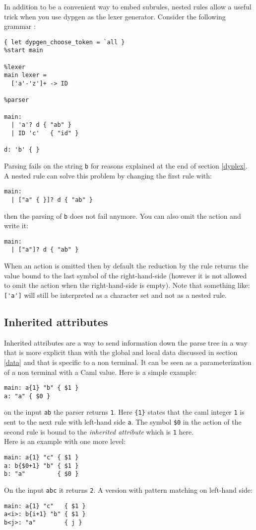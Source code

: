 \documentclass[12pt]{article}
\begin{document}
{In addition to be a convenient way to embed subrules, nested rules allow a useful trick when you use dypgen as the lexer generator. Consider the following grammar :
\begin{verbatim}
{ let dypgen_choose_token = `all }
%start main

%lexer
main lexer =
  ['a'-'z']+ -> ID

%parser

main:
  | 'a'? d { "ab" }
  | ID 'c'   { "id" }

d: 'b' { }
\end{verbatim}
Parsing fails on the string \verb|b| for reasons explained at the end of section \ref{dyplex}.\\

A nested rule can solve this problem by changing the first rule with:
\begin{verbatim}
main:
  | ["a" { }]? d { "ab" }
\end{verbatim}
then the parsing of \verb|b| does not fail anymore. You can also omit the action and write it:
\begin{verbatim}
main:
  | ["a"]? d { "ab" }
\end{verbatim}
When an action is omitted then by default the reduction by the rule returns the value bound to the last symbol of the right-hand-side (however it is not allowed to omit the action when the right-hand-side is empty). Note that something like: \verb|['a']| will still be interpreted as a character set and not as a nested rule.

\subsection{Inherited attributes}

Inherited attributes are a way to send information down the parse tree in a way that is more explicit than with the global and local data discussed in section \ref{data} and that is specific to a non terminal. It can be seen as a parameterization of a non terminal with a Caml value. Here is a simple example:
\begin{verbatim}
main: a{1} "b" { $1 }
a: "a" { $0 }
\end{verbatim}
on the input \verb|ab| the parser returns \verb|1|. Here \verb|{1}| states that the caml integer \verb|1| is sent to the next rule with left-hand side \verb|a|. The symbol \verb|$0| in the action of the second rule is bound to the \emph{inherited attribute} which is \verb|1| here.\\
Here is an example with one more level:
\begin{verbatim}
main: a{1} "c" { $1 }
a: b{$0+1} "b" { $1 }
b: "a"         { $0 }
\end{verbatim}
On the input \verb|abc| it returns \verb|2|. A version with pattern matching on left-hand side:
\begin{verbatim}
main: a{1} "c"   { $1 }
a<i>: b{i+1} "b" { $1 }
b<j>: "a"        { j }
\end{verbatim}

}
\end{document}
